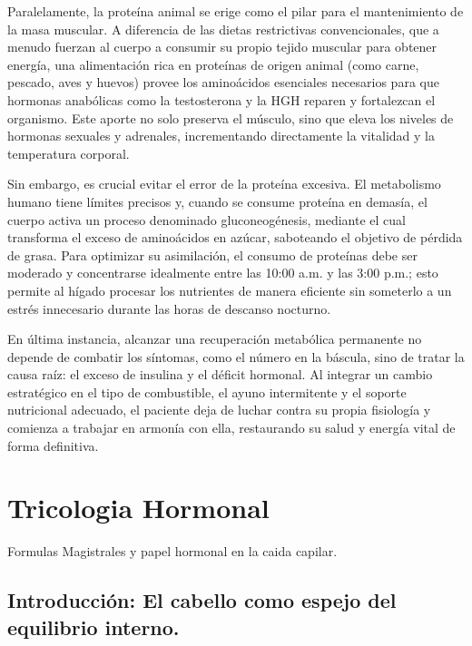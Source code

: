 \documentclass[
  spanish,
]{article}
\begin{document}
Paralelamente, la proteína animal se erige como el pilar para el mantenimiento de la masa muscular. A diferencia de las dietas restrictivas convencionales, que a menudo fuerzan al cuerpo a consumir su propio tejido muscular para obtener energía, una alimentación rica en proteínas de origen animal (como carne, pescado, aves y huevos) provee los aminoácidos esenciales necesarios para que hormonas anabólicas como la testosterona y la HGH reparen y fortalezcan el organismo. Este aporte no solo preserva el músculo, sino que eleva los niveles de hormonas sexuales y adrenales, incrementando directamente la vitalidad y la temperatura corporal.

Sin embargo, es crucial evitar el error de la proteína excesiva. El metabolismo humano tiene límites precisos y, cuando se consume proteína en demasía, el cuerpo activa un proceso denominado gluconeogénesis, mediante el cual transforma el exceso de aminoácidos en azúcar, saboteando el objetivo de pérdida de grasa. Para optimizar su asimilación, el consumo de proteínas debe ser moderado y concentrarse idealmente entre las 10:00 a.m. y las 3:00 p.m.; esto permite al hígado procesar los nutrientes de manera eficiente sin someterlo a un estrés innecesario durante las horas de descanso nocturno.

En última instancia, alcanzar una recuperación metabólica permanente no depende de combatir los síntomas, como el número en la báscula, sino de tratar la causa raíz: el exceso de insulina y el déficit hormonal. Al integrar un cambio estratégico en el tipo de combustible, el ayuno intermitente y el soporte nutricional adecuado, el paciente deja de luchar contra su propia fisiología y comienza a trabajar en armonía con ella, restaurando su salud y energía vital de forma definitiva.

\section{Tricologia Hormonal}\label{tricologia-hormonal}

Formulas Magistrales y papel hormonal en la caida capilar.

\subsection{Introducción: El cabello como espejo del equilibrio interno.}\label{introducciuxf3n-el-cabello-como-espejo-del-equilibrio-interno.}
\end{document}
